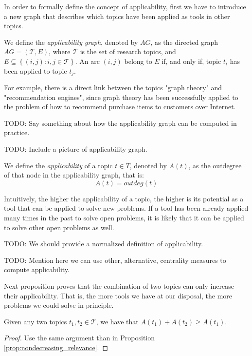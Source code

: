 In order to formally define the concept of applicability, first we have to introduce a new graph that describes which topics have been applied as tools in other topics.

\begin{definition}
\label{def:applicability-graph}
We define the \emph{applicability graph}, denoted by $AG$, as the directed graph $AG = (\mathcal{T}, E)$, where $\mathcal{T}$ is the set of research topics, and $E\subseteq\left\{ (i,j):i,j\in \mathcal{T} \right\} $. An arc $(i, j)$ belong to $E$ if, and only if, topic $t_i$ has been applied to topic $t_j$.
\end{definition}

For example, there is a direct link between the topics "graph theory" and "recommendation engines", since graph theory has been successfully applied to the problem of how to recommend purchase items to customers over Internet.

{\color{red} TODO: Say something about how the applicability graph can be computed in practice.}

{\color{red} TODO: Include a picture of applicability graph.}

\begin{definition}
\label{def:applicability}
We define the \emph{applicability} of a topic $t\in T$, denoted by $A(t)$, as the outdegree of that node in the applicability graph, that is:
\[
A(t) = outdeg(t)
\]
\end{definition}

Intuitively, the higher the applicability of a topic, the higher is its potential as a tool that can be applied to solve new problems. If a tool has been already applied many times in the past to solve open problems, it is likely that it can be applied to solve other open problems as well.

{\color{red} TODO: We should provide a normalized definition of applicability.}

{\color{red} TODO: Mention here we can use other, alternative, centrality measures to compute applicability.}

Next proposition proves that the combination of two topics can only increase their applicability. That is, the more tools we have at our disposal, the more problems we could solve in principle.

\begin{proposition}
Given any two topics $t_1, t_2 \in \mathcal{T}$, we have that $A(t_1) + A(t_2) \geq A(t_1)$.
\end{proposition}
\begin{proof}
Use the same argument than in Proposition \ref{prop:nondecreasing_relevance}.
\end{proof}

